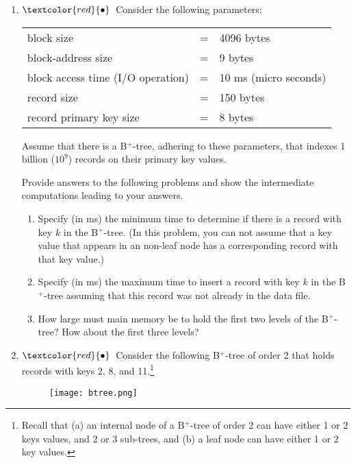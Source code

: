 \documentclass{article}
\newcommand{\redbullet}{$\textcolor{red}{\bullet}$}
\begin{document}
\begin{enumerate}[resume]
\item \redbullet\ 
Consider the following parameters:
\begin{center}
\begin{tabular}{lcl}
block size         & = & 4096 bytes \\
block-address size & = & 9 bytes \\
block access time (I/O operation) & = & 10 ms (micro seconds) \\
record size       & = & 150 bytes \\
record primary key size   & = & 8 bytes \\
\end{tabular}
\end{center}
Assume that there is a B$^+$-tree, adhering to these parameters, that
indexes 1 billion ($10^9$) records on their primary key values.

Provide answers to the following problems and 
show the intermediate computations leading to your answers.

\begin{enumerate}
\item   Specify (in ms) the minimum time to determine if there is a record with
  key $k$ in the B$^+$-tree.
(In this problem, you can not assume that a key value that appears in an non-leaf node has a corresponding record with that key value.)

\item \label{maximum} Specify (in ms) the maximum time to insert a record
with key $k$ in the B$^+$-tree assuming that this record was not already in the data file.

\item  How large must main memory be to hold the first two levels of the B$^+$-tree? How about the first three levels?
\end{enumerate}

\newpage
\item \redbullet\  Consider the following B$^+$-tree of order 2 that holds records
  with keys 2, 8, and 11.\footnote{Recall that (a) an internal node of a
  B$^+$-tree of order 2 can have either 1 or 2 keys values, and 2 or 3
  sub-trees, and (b) a leaf node can have either 1 or 2 key values.}
  
\begin{figure}[h]
\centering
\texttt{[image: btree.png]}
\end{figure}
\begin{enumerate}


\end{enumerate}
\end{enumerate}
\end{document}
